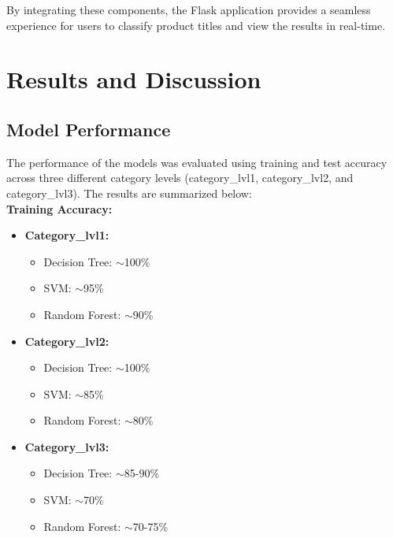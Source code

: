 \documentclass[10pt]{article}
\begin{document}
By integrating these components, the Flask application provides a seamless experience for users to classify product titles and view the results in real-time.

\section{Results and Discussion}

\subsection{Model Performance}
The performance of the models was evaluated using training and test accuracy across three different category levels (category\_lvl1, category\_lvl2, and category\_lvl3). The results are summarized below:\\

\textbf{Training Accuracy:}
\begin{itemize}
    \item \textbf{Category\_lvl1:}
    \begin{itemize}
        \item Decision Tree: $\sim$100\%
        \item SVM: $\sim$95\%
        \item Random Forest: $\sim$90\%
    \end{itemize}
    \item \textbf{Category\_lvl2:}
    \begin{itemize}
        \item Decision Tree: $\sim$100\%
        \item SVM: $\sim$85\%
        \item Random Forest: $\sim$80\%
    \end{itemize}
    \item \textbf{Category\_lvl3:}
    \begin{itemize}
        \item Decision Tree: $\sim$85-90\%
        \item SVM: $\sim$70\%
        \item Random Forest: $\sim$70-75\%
    \end{itemize}
\end{itemize}
\end{document}
